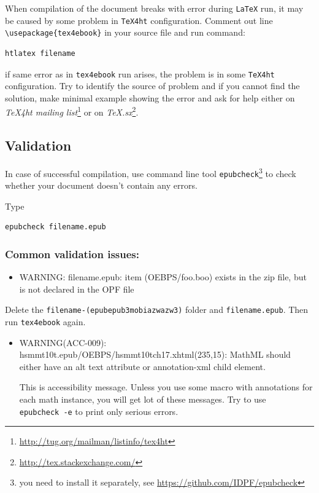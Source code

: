 When compilation of the document breaks with error during \texttt{LaTeX}
run, it may be caused by some problem in \texttt{TeX4ht} configuration.
Comment out line \texttt{\textbackslash{}usepackage\{tex4ebook\}} in
your source file and run command:

\begin{verbatim}
htlatex filename 
\end{verbatim}

if same error as in \texttt{tex4ebook} run arises, the problem is in
some \texttt{TeX4ht} configuration. Try to identify the source of
problem and if you cannot find the solution, make minimal example
showing the error and ask for help either on \emph{TeX4ht mailing
list}\footnote{\url{http://tug.org/mailman/listinfo/tex4ht}} or on
\emph{TeX.sx}\footnote{\url{http://tex.stackexchange.com/}}.

\hypertarget{validation}{%
\subsection{Validation}\label{validation}}

In case of successful compilation, use command line tool
\texttt{epubcheck}\footnote{you need to install it separately, see
  \url{https://github.com/IDPF/epubcheck}} to check whether your
document doesn't contain any errors.

Type

\begin{verbatim}
epubcheck filename.epub
\end{verbatim}

\hypertarget{common-validation-issues}{%
\subsubsection{Common validation
issues:}\label{common-validation-issues}}

\begin{itemize}
\tightlist
\item
  WARNING: filename.epub: item (OEBPS/foo.boo) exists in the zip file,
  but is not declared in the OPF file
\end{itemize}

Delete the
\texttt{filename-(epub\textbar{}epub3\textbar{}mobi\textbar{}azw\textbar{}azw3)}
folder and \texttt{filename.epub}. Then run \texttt{tex4ebook} again.

\begin{itemize}
\item
  WARNING(ACC-009): hsmmt10t.epub/OEBPS/hsmmt10tch17.xhtml(235,15):
  MathML should either have an alt text attribute or annotation-xml
  child element.

  This is accessibility message. Unless you use some macro with
  annotations for each math instance, you will get lot of these
  messages. Try to use \texttt{epubcheck\ -e} to print only serious
  errors.
\end{itemize}
